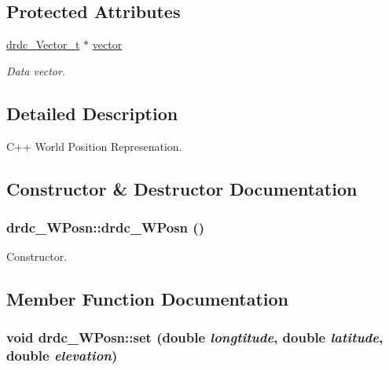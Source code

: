 \subsection*{Protected Attributes}
\begin{CompactItemize}
\item 
\hyperlink{structdrdc__Vector__t}{drdc\_\-Vector\_\-t} $\ast$ \hyperlink{classdrdc__WPosn_635738b33966d90cc50ea00a4f1a0aa4}{vector}
\begin{CompactList}\small\item\em Data vector. \item\end{CompactList}\end{CompactItemize}


\subsection{Detailed Description}
C++ World Position Represenation. 



\subsection{Constructor \& Destructor Documentation}
\hypertarget{classdrdc__WPosn_6b8b3e66b18965be99434cbd494bd79d}{
\subsubsection[drdc\_\-WPosn]{\setlength{\rightskip}{0pt plus 5cm}drdc\_\-WPosn::drdc\_\-WPosn ()}}
\label{classdrdc__WPosn_6b8b3e66b18965be99434cbd494bd79d}


Constructor. 



\subsection{Member Function Documentation}
\hypertarget{classdrdc__WPosn_3c292a1607fb80b5a8ec3ebfaff212f7}{
\subsubsection[set]{\setlength{\rightskip}{0pt plus 5cm}void drdc\_\-WPosn::set (double {\em longtitude}, \/  double {\em latitude}, \/  double {\em elevation})}}
\label{classdrdc__WPosn_3c292a1607fb80b5a8ec3ebfaff212f7}



